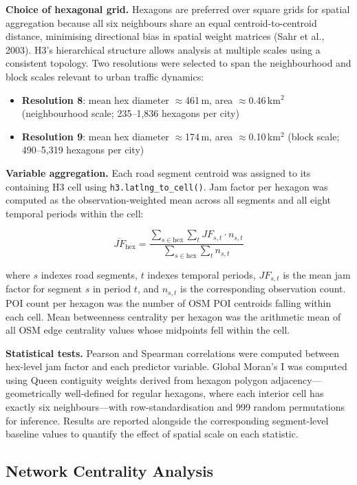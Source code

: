 \documentclass[12pt,a4paper]{article}
\begin{document}
\textbf{Choice of hexagonal grid.} Hexagons are preferred over square grids for spatial aggregation because all six neighbours share an equal centroid-to-centroid distance, minimising directional bias in spatial weight matrices (Sahr et al., 2003). H3's hierarchical structure allows analysis at multiple scales using a consistent topology. Two resolutions were selected to span the neighbourhood and block scales relevant to urban traffic dynamics:

\begin{itemize}
  \item \textbf{Resolution 8}: mean hex diameter $\approx$461\,m, area $\approx$0.46\,km$^2$ (neighbourhood scale; 235--1,836 hexagons per city)
  \item \textbf{Resolution 9}: mean hex diameter $\approx$174\,m, area $\approx$0.10\,km$^2$ (block scale; 490--5,319 hexagons per city)
\end{itemize}

\textbf{Variable aggregation.} Each road segment centroid was assigned to its containing H3 cell using \texttt{h3.latlng\_to\_cell()}. Jam factor per hexagon was computed as the observation-weighted mean across all segments and all eight temporal periods within the cell:

\[\overline{JF}_{\text{hex}} = \frac{\displaystyle\sum_{s \in \text{hex}} \sum_{t} JF_{s,t} \cdot n_{s,t}}{\displaystyle\sum_{s \in \text{hex}} \sum_{t} n_{s,t}}\]

where $s$ indexes road segments, $t$ indexes temporal periods, $JF_{s,t}$ is the mean jam factor for segment $s$ in period $t$, and $n_{s,t}$ is the corresponding observation count. POI count per hexagon was the number of OSM POI centroids falling within each cell. Mean betweenness centrality per hexagon was the arithmetic mean of all OSM edge centrality values whose midpoints fell within the cell.

\textbf{Statistical tests.} Pearson and Spearman correlations were computed between hex-level jam factor and each predictor variable. Global Moran's I was computed using Queen contiguity weights derived from hexagon polygon adjacency---geometrically well-defined for regular hexagons, where each interior cell has exactly six neighbours---with row-standardisation and 999 random permutations for inference. Results are reported alongside the corresponding segment-level baseline values to quantify the effect of spatial scale on each statistic.

\subsection{Network Centrality Analysis}
\end{document}
